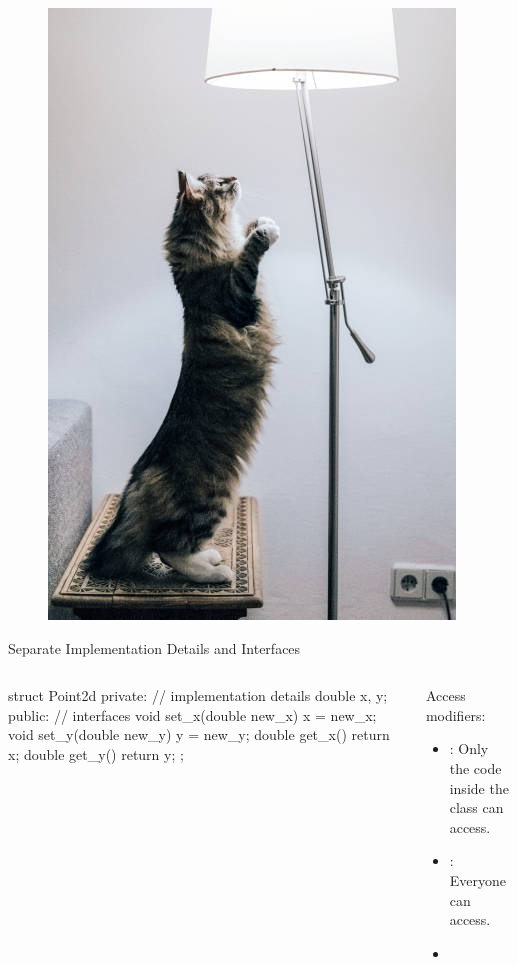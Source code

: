 \documentclass{beamer}
\begin{document}
\begin{frame}
    \begin{figure}[h]
        \centering
        \includegraphics[height=0.9\textheight]{img/lamp.jpg}
    \end{figure}
\end{frame}

\begin{frame}[fragile]{Separate Implementation Details and Interfaces}
    \begin{columns}
        \begin{column}{0.5\linewidth}
            \begin{cpp}
struct Point2d {
 private:
  // implementation details
  double x, y;
 public:
  // interfaces
  void set_x(double new_x)
    { x = new_x; }
  void set_y(double new_y)
    { y = new_y; }
  double get_x()
    { return x; }
  double get_y()
    { return y; }
};
            \end{cpp}   
        \end{column}
        \begin{column}{0.5\linewidth}
            Access modifiers:
            \begin{itemize}
                \item {}: Only the code inside the class  can access.
                \item {}: Everyone can access.
                \item {}
            \end{itemize}
        \end{column}
    \end{columns}
\end{frame}
\end{document}
